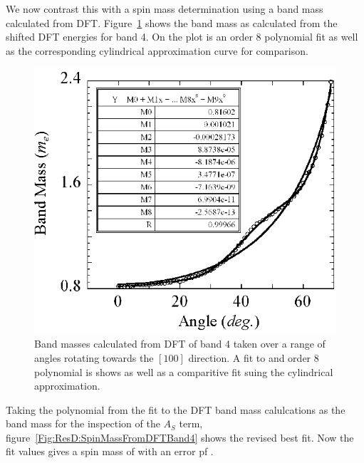 We now contrast this with a spin mass determination using a band mass calculated from \ac{DFT}. Figure~\ref{Fig:ResD:DFTBandMassBand4} shows the band mass as calculated from the shifted \ac{DFT} energies for band 4. On the plot is an order 8 polynomial fit as well as the corresponding cylindrical approximation curve for comparison.
\begin{figure}[htbp]
    \begin{center}
        \includegraphics[scale=0.9]{Chapter-dHvABaFe2P2/Figures/Mass/DFTBandMassBand4/DFTBandMassBand4}
        \caption{Band masses calculated from \ac{DFT} of band 4 taken over a range of angles rotating towards the $[100]$ direction. A fit to and order 8 polynomial is shows as well as a comparitive fit suing the cylindrical approximation.}
        \label{Fig:ResD:DFTBandMassBand4}
    \end{center}
\end{figure}
Taking the polynomial from the fit to the \ac{DFT} band mass calulcations as the band mass for the inspection of the $A_S$ term, figure~\ref{Fig:ResD:SpinMassFromDFTBand4} shows the revised best fit. Now the fit values gives a spin mass of  with an error pf .
